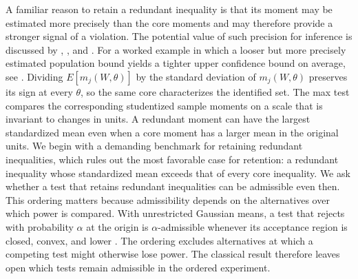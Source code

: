\documentclass[11pt]{article}
\numberwithin{equation}{section}
\theoremstyle{definition}
\begin{document}
A familiar reason to retain a redundant inequality is that its moment may be estimated more precisely than the core moments and may therefore provide a stronger signal of a violation. The potential value of such precision for inference is discussed by \citet[Section~9.1]{chesher/rosen:20}, \citet{chernozhukov/chet/kato:19}, and \citet{molinari:20}. For a worked example in which a looser but more precisely estimated population bound yields a tighter upper confidence bound on average, see \citet[Remark~2]{ponomarev/semenova:25}. Dividing $E[m_j(W,\theta)]$ by the standard deviation of $m_j(W,\theta)$ preserves its sign at every $\theta$, so the same core characterizes the identified set. The max test compares the corresponding studentized sample moments on a scale that is invariant to changes in units. A redundant moment can have the largest standardized mean even when a core moment has a larger mean in the original units. We begin with a demanding benchmark for retaining redundant inequalities, which rules out the most favorable case for retention: a redundant inequality whose standardized mean exceeds that of every core inequality. We ask whether a test that retains redundant inequalities can be admissible even then. This ordering matters because admissibility depends on the alternatives over which power is compared. With unrestricted Gaussian means, a test that rejects with probability $\alpha$ at the origin is $\alpha$-admissible whenever its acceptance region is closed, convex, and lower \citep[Theorem~6.7.1 and Corollary~6.7.1]{lehmann/romano:05}. The ordering excludes alternatives at which a competing test might otherwise lose power. The classical result therefore leaves open which tests remain admissible in the ordered experiment.
\end{document}
